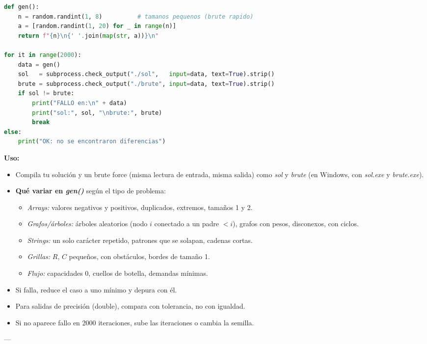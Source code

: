 \documentclass[10pt]{article}
\begin{document}
\begin{multicols}{2}
\begin{lstlisting}[language=Python]
def gen():
    n = random.randint(1, 8)          # tamanos pequenos (brute rapido)
    a = [random.randint(1, 20) for _ in range(n)]
    return f"{n}\n{' '.join(map(str, a))}\n"

for it in range(2000):
    data = gen()
    sol   = subprocess.check_output("./sol",   input=data, text=True).strip()
    brute = subprocess.check_output("./brute", input=data, text=True).strip()
    if sol != brute:
        print("FALLO en:\n" + data)
        print("sol:", sol, "\nbrute:", brute)
        break
else:
    print("OK: no se encontraron diferencias")
\end{lstlisting}

\textbf{Uso:}
\begin{itemize}\setlength{\itemsep}{1pt}
  \item Compila tu solución y un brute force (misma lectura de entrada, misma salida) como \textit{sol} y \textit{brute} (en Windows, con \textit{sol.exe} y \textit{brute.exe}).
  \item \textbf{Qué variar en \textit{gen()}} según el tipo de problema:
  \begin{itemize}\setlength{\itemsep}{1pt}
    \item \textit{Arrays:} valores negativos y positivos, duplicados, extremos, tamaños 1 y 2.
    \item \textit{Grafos/árboles:} árboles aleatorios (nodo $i$ conectado a un padre $< i$), grafos con pesos, disconexos, con ciclos.
    \item \textit{Strings:} un solo carácter repetido, patrones que se solapan, cadenas cortas.
    \item \textit{Grillas:} $R$, $C$ pequeños, con obstáculos, bordes de tamaño 1.
    \item \textit{Flujo:} capacidades 0, cuellos de botella, demandas mínimas.
  \end{itemize}
  \item Si falla, reduce el caso a uno mínimo y depura con él.
  \item Para salidas de precisión (double), compara con tolerancia, no con igualdad.
  \item Si no aparece fallo en 2000 iteraciones, sube las iteraciones o cambia la semilla.
\end{itemize}

---


\end{multicols}
\end{document}
